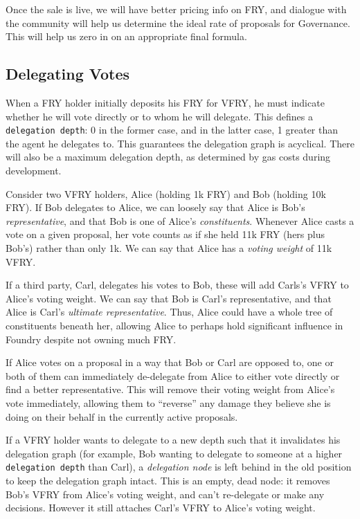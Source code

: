 Once the sale is live, we will have better pricing info on FRY, and dialogue with the community will help us determine the ideal rate of proposals for Governance. This will help us zero in on an appropriate final formula.

\subsection{Delegating Votes} \label{delegating}

When a FRY holder initially deposits his FRY for VFRY, he must indicate whether he will vote directly or to whom he will delegate. This defines a \verb|delegation depth|: 0 in the former case, and in the latter case, 1 greater than the agent he delegates to. This guarantees the delegation graph is acyclical. There will also be a maximum delegation depth, as determined by gas costs during development.

Consider two VFRY holders, Alice (holding 1k FRY) and Bob (holding 10k FRY). If Bob delegates to Alice, we can loosely say that Alice is Bob's \textit{representative}, and that Bob is one of Alice's \textit{constituents}. Whenever Alice casts a vote on a given proposal, her vote counts as if she held 11k FRY (hers plus Bob's) rather than only 1k. We can say that Alice has a \textit{voting weight} of 11k VFRY.

If a third party, Carl, delegates his votes to Bob, these will add Carls's VFRY to Alice's voting weight. We can say that Bob is Carl's representative, and that Alice is Carl's \textit{ultimate representative}. Thus, Alice could have a whole tree of constituents beneath her, allowing Alice to perhaps hold significant influence in Foundry despite not owning much FRY.

If Alice votes on a proposal in a way that Bob or Carl are opposed to, one or both of them can immediately de-delegate from Alice to either vote directly or find a better representative. This will remove their voting weight from Alice's vote immediately, allowing them to ``reverse'' any damage they believe she is doing on their behalf in the currently active proposals.

If a VFRY holder wants to delegate to a new depth such that it invalidates his delegation graph (for example, Bob wanting to delegate to someone at a higher \verb|delegation depth| than Carl), a \textit{delegation node} is left behind in the old position to keep the delegation graph intact. This is an empty, dead node: it removes Bob's VFRY from Alice's voting weight, and can't re-delegate or make any decisions. However it still attaches Carl's VFRY to Alice's voting weight.

